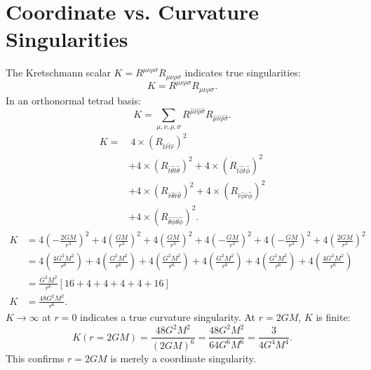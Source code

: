 \documentclass[11pt, a4paper]{report}
\begin{document}
\section{Coordinate vs. Curvature Singularities}
The Kretschmann scalar $K = R^{\mu\nu\rho\sigma}R_{\mu\nu\rho\sigma}$ indicates true singularities:
\begin{equation}
K = R^{\mu\nu\rho\sigma}R_{\mu\nu\rho\sigma}.
\end{equation}
In an orthonormal tetrad basis:
\begin{equation}
K = \sum_{\mu,\nu,\rho,\sigma} R^{\hat{\mu}\hat{\nu}\hat{\rho}\hat{\sigma}}R_{\hat{\mu}\hat{\nu}\hat{\rho}\hat{\sigma}}.
\end{equation}
\begin{align}
K =& \ 4 \times (R_{\hat{t}\hat{r}\hat{t}\hat{r}})^{2} \nonumber \\
&+ 4 \times (R_{\hat{t}\hat{\theta}\hat{t}\hat{\theta}})^{2} + 4 \times (R_{\hat{t}\hat{\phi}\hat{t}\hat{\phi}})^{2} \nonumber \\
&+ 4 \times (R_{\hat{r}\hat{\theta}\hat{r}\hat{\theta}})^{2} + 4 \times (R_{\hat{r}\hat{\phi}\hat{r}\hat{\phi}})^{2} \nonumber \\
&+ 4 \times (R_{\hat{\theta}\hat{\phi}\hat{\theta}\hat{\phi}})^{2}.
\end{align}
\begin{align}
K &= 4\left(-\frac{2GM}{r^{3}}\right)^{2} + 4\left(\frac{GM}{r^{3}}\right)^{2} + 4\left(\frac{GM}{r^{3}}\right)^{2} + 4\left(-\frac{GM}{r^{3}}\right)^{2} + 4\left(-\frac{GM}{r^{3}}\right)^{2} + 4\left(\frac{2GM}{r^{3}}\right)^{2} \nonumber \\
&= 4\left(\frac{4G^{2}M^{2}}{r^{6}}\right) + 4\left(\frac{G^{2}M^{2}}{r^{6}}\right) + 4\left(\frac{G^{2}M^{2}}{r^{6}}\right) + 4\left(\frac{G^{2}M^{2}}{r^{6}}\right) + 4\left(\frac{G^{2}M^{2}}{r^{6}}\right) + 4\left(\frac{4G^{2}M^{2}}{r^{6}}\right) \nonumber \\
&= \frac{G^{2}M^{2}}{r^{6}} \left[ 16 + 4 + 4 + 4 + 4 + 16 \right] \nonumber \\
K &= \frac{48G^{2}M^{2}}{r^{6}}.
\end{align}
$K \to \infty$ at $r=0$ indicates a true curvature singularity. At $r=2GM$, $K$ is finite:
\begin{equation}
K(r=2GM) = \frac{48G^{2}M^{2}}{(2GM)^{6}} = \frac{48G^{2}M^{2}}{64G^{6}M^{6}} = \frac{3}{4G^{4}M^{4}}.
\end{equation}
This confirms $r=2GM$ is merely a coordinate singularity.
\end{document}
